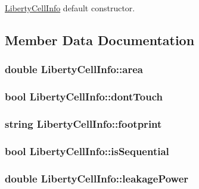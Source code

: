 \hyperlink{structLibertyCellInfo}{Liberty\-Cell\-Info} default constructor. 



\subsection{Member Data Documentation}
\hypertarget{structLibertyCellInfo_a9fe14565c391db64fe59b885db703ba2}{
\subsubsection[{area}]{\setlength{\rightskip}{0pt plus 5cm}double Liberty\-Cell\-Info\-::area}}\label{structLibertyCellInfo_a9fe14565c391db64fe59b885db703ba2}
\hypertarget{structLibertyCellInfo_aad4eed91d5d0ecdda6ade0356ef8e5cf}{
\subsubsection[{dont\-Touch}]{\setlength{\rightskip}{0pt plus 5cm}bool Liberty\-Cell\-Info\-::dont\-Touch}}\label{structLibertyCellInfo_aad4eed91d5d0ecdda6ade0356ef8e5cf}
\hypertarget{structLibertyCellInfo_af9b2d1f00a5d75b8e61bf3ce110a2d33}{
\subsubsection[{footprint}]{\setlength{\rightskip}{0pt plus 5cm}string Liberty\-Cell\-Info\-::footprint}}\label{structLibertyCellInfo_af9b2d1f00a5d75b8e61bf3ce110a2d33}
\hypertarget{structLibertyCellInfo_a7d8643908315b2a90faf453fa475b2ea}{
\subsubsection[{is\-Sequential}]{\setlength{\rightskip}{0pt plus 5cm}bool Liberty\-Cell\-Info\-::is\-Sequential}}\label{structLibertyCellInfo_a7d8643908315b2a90faf453fa475b2ea}
\hypertarget{structLibertyCellInfo_a160c15b0dffa8079ec5bd52115f0d6cf}{
\subsubsection[{leakage\-Power}]{\setlength{\rightskip}{0pt plus 5cm}double Liberty\-Cell\-Info\-::leakage\-Power}}\label{structLibertyCellInfo_a160c15b0dffa8079ec5bd52115f0d6cf}
